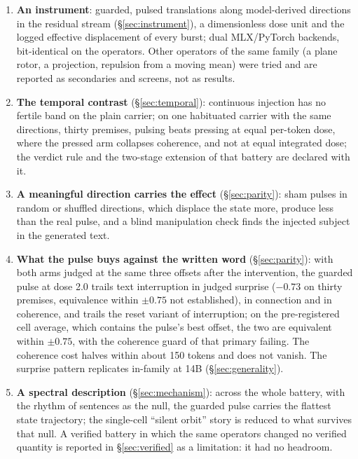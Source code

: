 \documentclass[11pt]{article}
\begin{document}
\begin{enumerate}
\item \textbf{An instrument}: guarded, pulsed translations along
  model-derived directions in the residual stream
  (\S\ref{sec:instrument}), a dimensionless dose unit and the logged
  effective displacement of every burst; dual MLX/PyTorch backends,
  bit-identical on the operators. Other operators of the same family
  (a plane rotor, a projection, repulsion from a moving mean) were
  tried and are reported as secondaries and screens, not as results.
\item \textbf{The temporal contrast} (\S\ref{sec:temporal}): continuous
  injection has no fertile band on the plain carrier; on one habituated
  carrier with the same directions, thirty premises, pulsing beats
  pressing at equal per-token dose, where the pressed arm collapses
  coherence, and not at equal integrated dose; the verdict rule and
  the two-stage extension of that battery are declared with it.
\item \textbf{A meaningful direction carries the effect}
  (\S\ref{sec:parity}): sham pulses in random or shuffled directions,
  which displace the state more, produce less than the real pulse, and
  a blind manipulation check finds the injected subject in the
  generated text.
\item \textbf{What the pulse buys against the written word}
  (\S\ref{sec:parity}): with both arms judged at the same three offsets
  after the intervention, the guarded pulse at dose 2.0 trails text
  interruption in judged surprise ($-0.73$ on thirty premises,
  equivalence within $\pm0.75$ not established), in connection and in
  coherence, and trails the reset variant of interruption; on the
  pre-registered cell average, which contains the pulse's best offset,
  the two are equivalent within $\pm0.75$, with the coherence guard of
  that primary failing. The coherence cost halves within about 150
  tokens and does not vanish. The surprise pattern replicates in-family
  at 14B (\S\ref{sec:generality}).
\item \textbf{A spectral description} (\S\ref{sec:mechanism}): across
  the whole battery, with the rhythm of sentences as the null, the
  guarded pulse carries the flattest state trajectory; the single-cell
  ``silent orbit'' story is reduced to what survives that null. A
  verified battery in which the same operators changed no verified
  quantity is reported in \S\ref{sec:verified} as a limitation: it had
  no headroom.
\end{enumerate}
\end{document}
